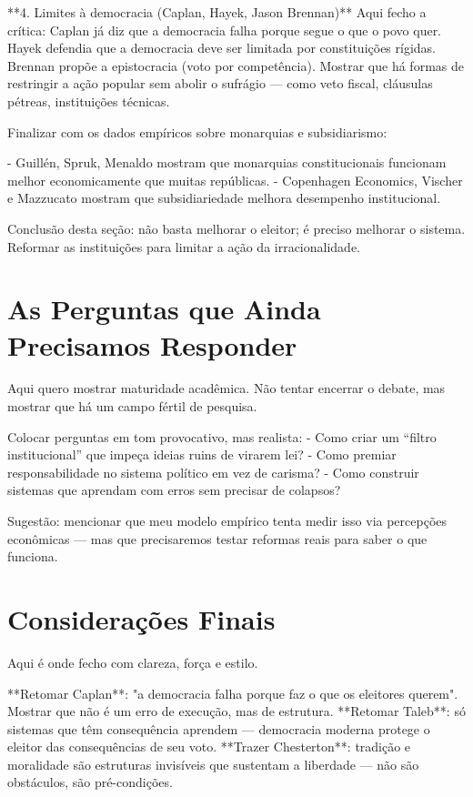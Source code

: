 **4. Limites à democracia (Caplan, Hayek, Jason Brennan)**  
Aqui fecho a crítica: Caplan já diz que a democracia falha porque segue o que o povo quer. Hayek defendia que a democracia deve ser limitada por constituições rígidas. Brennan propõe a epistocracia (voto por competência). Mostrar que há formas de restringir a ação popular sem abolir o sufrágio — como veto fiscal, cláusulas pétreas, instituições técnicas.

Finalizar com os dados empíricos sobre monarquias e subsidiarismo:

- Guillén, Spruk, Menaldo mostram que monarquias constitucionais funcionam melhor economicamente que muitas repúblicas.
- Copenhagen Economics, Vischer e Mazzucato mostram que subsidiariedade melhora desempenho institucional.
  
Conclusão desta seção: não basta melhorar o eleitor; é preciso melhorar o sistema. Reformar as instituições para limitar a ação da irracionalidade.

\section{As Perguntas que Ainda Precisamos Responder} 

Aqui quero mostrar maturidade acadêmica. Não tentar encerrar o debate, mas mostrar que há um campo fértil de pesquisa.

Colocar perguntas em tom provocativo, mas realista:
- Como criar um “filtro institucional” que impeça ideias ruins de virarem lei?
- Como premiar responsabilidade no sistema político em vez de carisma?
- Como construir sistemas que aprendam com erros sem precisar de colapsos?

Sugestão: mencionar que meu modelo empírico tenta medir isso via percepções econômicas — mas que precisaremos testar reformas reais para saber o que funciona.

\section{Considerações Finais} %

Aqui é onde fecho com clareza, força e estilo.

**Retomar Caplan**: "a democracia falha porque faz o que os eleitores querem". Mostrar que não é um erro de execução, mas de estrutura.  
**Retomar Taleb**: só sistemas que têm consequência aprendem — democracia moderna protege o eleitor das consequências de seu voto.  
**Trazer Chesterton**: tradição e moralidade são estruturas invisíveis que sustentam a liberdade — não são obstáculos, são pré-condições.

